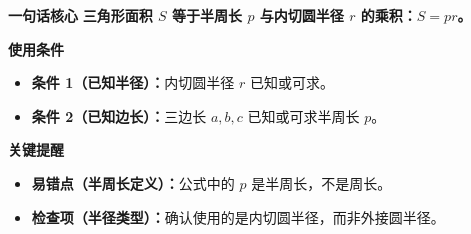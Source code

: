 \begin{summarybox}
	\textbf{\textcolor{CSummary}{一句话核心}}
	\textbf{三角形面积 $S$ 等于半周长 $p$ 与内切圆半径 $r$ 的乘积：$S = pr$。}

	\medskip
	\textbf{\textcolor{CSummary}{使用条件}}
	\begin{itemize}[leftmargin=*, itemsep=0.5em, topsep=0.4em]
		\item \textbf{条件 1（已知半径）：}内切圆半径 $r$ 已知或可求。
		\item \textbf{条件 2（已知边长）：}三边长 $a,b,c$ 已知或可求半周长 $p$。
	\end{itemize}

	\medskip
	\textbf{\textcolor{CSummary}{关键提醒}}
	\begin{itemize}[leftmargin=*, itemsep=0.5em, topsep=0.4em]
		\item \textbf{易错点（半周长定义）：}公式中的 $p$ 是半周长，不是周长。
		\item \textbf{检查项（半径类型）：}确认使用的是内切圆半径，而非外接圆半径。
	\end{itemize}

\end{summarybox}
